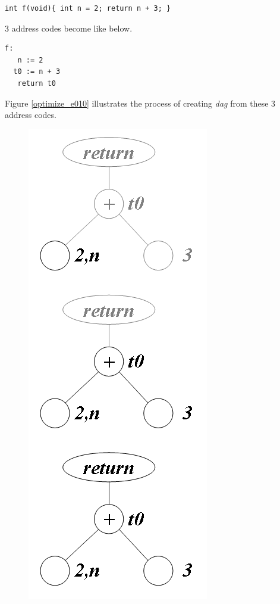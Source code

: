 \begin{Example}
\label{optimize_e009}
\begin{verbatim}
int f(void){ int n = 2; return n + 3; }
\end{verbatim}
3 address codes become like below.
\begin{verbatim}
f:
   n := 2
  t0 := n + 3
   return t0
\end{verbatim}
Figure \ref{optimize_e010} illustrates the process of creating
{\em dag} from these 3 address codes.
\begin{figure}[htbp]
\begin{center}
\begin{htmlonly}
\includegraphics[width=0.392\linewidth,height=1.0\linewidth]{opt002.png}
\end{htmlonly}
\begin{latexonly}

\end{latexonly}
\end{center}
\end{figure}
\end{Example}
